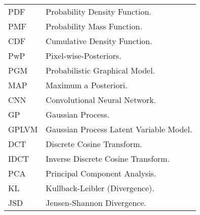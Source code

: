 \begin{longtable}{p{} | p{}}
  PDF & Probability Density Function.\\
  PMF & Probability Mass Function.\\
  CDF & Cumulative Density Function.\\
  PwP & Pixel-wise-Posteriors.\\
  PGM & Probabilistic Graphical Model.\\
  MAP & Maximum a Posteriori.\\
  CNN & Convolutional Neural Network.\\
  GP & Gaussian Process.\\
  GPLVM & Gaussian Process Latent Variable Model.\\
  DCT & Discrete Cosine Transform.\\
  IDCT & Inverse Discrete Cosine Transform.\\
  PCA & Principal Component Analysis.\\
  KL & Kullback-Leibler (Divergence).\\
  JSD & Jensen-Shannon Divergence.
~\label{table:abbreviations}
\end{longtable}
